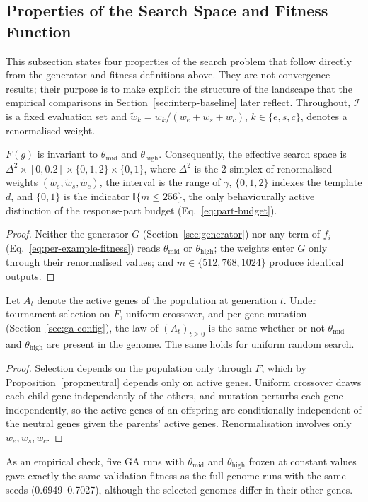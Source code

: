 \documentclass[mathematics,article,submit,xetex,moreauthors]{Definitions/mdpi}
\begin{document}
\subsection{Properties of the Search Space and Fitness Function}
\label{sec:landscape}

This subsection states four properties of the search problem that follow
directly from the generator and fitness definitions above. They are not
convergence results; their purpose is to make explicit the structure of the
landscape that the empirical comparisons in Section~\ref{sec:interp-baseline}
later reflect. Throughout, $\mathcal{I}$ is a fixed evaluation set and
$\tilde w_k = w_k/(w_e+w_s+w_c)$, $k\in\{e,s,c\}$, denotes a renormalised weight.

\begin{Proposition}\label{prop:neutral}
$F(g)$ is invariant to $\theta_{\mathrm{mid}}$ and $\theta_{\mathrm{high}}$.
Consequently, the effective search space is
$\Delta^{2}\times[0,0.2]\times\{0,1,2\}\times\{0,1\}$, where $\Delta^{2}$ is the
2-simplex of renormalised weights $(\tilde w_e,\tilde w_s,\tilde w_c)$, the
interval is the range of $\gamma$, $\{0,1,2\}$ indexes the template $d$, and
$\{0,1\}$ is the indicator $\mathbb{I}\{m\le256\}$, the only behaviourally
active distinction of the response-part budget (Eq.~\eqref{eq:part-budget}).
\end{Proposition}
\begin{proof}
Neither the generator $G$ (Section~\ref{sec:generator}) nor any term of
$f_i$ (Eq.~\eqref{eq:per-example-fitness}) reads $\theta_{\mathrm{mid}}$ or
$\theta_{\mathrm{high}}$; the weights enter $G$ only through their
renormalised values; and $m\in\{512,768,1024\}$ produce identical outputs.
\end{proof}

\begin{Proposition}\label{prop:dynamics}
Let $A_t$ denote the active genes of the population at generation $t$. Under
tournament selection on $F$, uniform crossover, and per-gene mutation
(Section~\ref{sec:ga-config}), the law of $(A_t)_{t\ge0}$ is the same whether
or not $\theta_{\mathrm{mid}}$ and $\theta_{\mathrm{high}}$ are present in the
genome. The same holds for uniform random search.
\end{Proposition}
\begin{proof}
Selection depends on the population only through $F$, which by
Proposition~\ref{prop:neutral} depends only on active genes. Uniform crossover
draws each child gene independently of the others, and mutation perturbs each
gene independently, so the active genes of an offspring are conditionally
independent of the neutral genes given the parents' active genes.
Renormalisation involves only $w_e,w_s,w_c$.
\end{proof}
\noindent As an empirical check, five GA runs with $\theta_{\mathrm{mid}}$ and
$\theta_{\mathrm{high}}$ frozen at constant values gave exactly the same
validation fitness as the full-genome runs with the same seeds
(0.6949--0.7027), although the selected genomes differ in their other genes.
\end{document}
